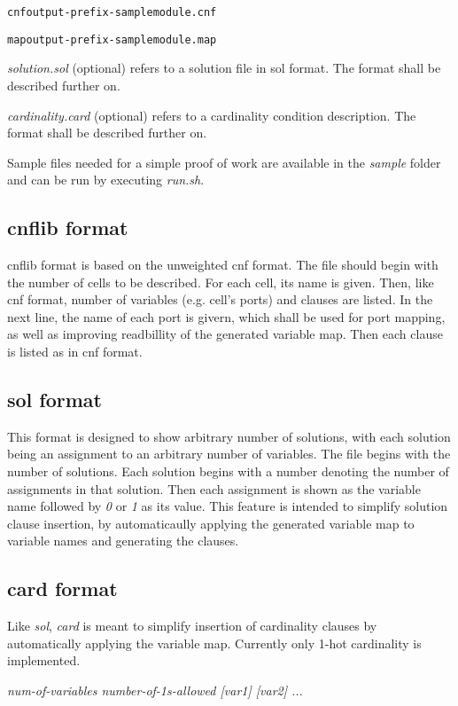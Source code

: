 \documentclass{article}
\begin{document}
    \lstinline{cnfoutput-prefix-samplemodule.cnf}

    \lstinline{mapoutput-prefix-samplemodule.map}

    \textit{solution.sol} (optional) refers to a solution file in sol format. The format shall be described further on.

    \textit{cardinality.card} (optional) refers to a cardinality condition description. The format shall be described further on.

    Sample files needed for a simple proof of work are available in the \textit{sample} folder and can be run by executing 
    \textit{run.sh}.

    \subsection{cnflib format}
    cnflib format is based on the unweighted cnf format. The file should begin with the number of cells to be described. 
    For each cell, its name is given. Then, like cnf format, number of variables (e.g. cell's ports) and clauses are listed.
    In the next line, the name of each port is givern, which shall be used for port mapping, as well as improving readbillity of 
    the generated variable map. Then each clause is listed as in cnf format. 

    

    \subsection{sol format}
    This format is designed to show arbitrary number of solutions, with each solution being an assignment to an arbitrary number 
    of variables. The file begins with the number of solutions. 
    Each solution begins with a number denoting the number of assignments in that solution. Then each assignment is shown as the 
    variable name followed by \textit{0} or \textit{1} as its value. 
    This feature is intended to simplify solution clause insertion, by automaticaully applying the generated variable map to 
    variable names and generating the clauses. 

    

    \subsection{card format}
    Like \textit{sol}, \textit{card} is meant to simplify insertion of cardinality clauses by automatically applying the variable map. 
    Currently only 1-hot cardinality is implemented. 

    \textit{num-of-variables number-of-1s-allowed [var1] [var2] ...}

    
\end{document}
